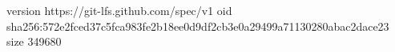version https://git-lfs.github.com/spec/v1
oid sha256:572e2fced37c5fca983fe2b18ee0d9df2cb3e0a29499a71130280abac2dace23
size 349680
